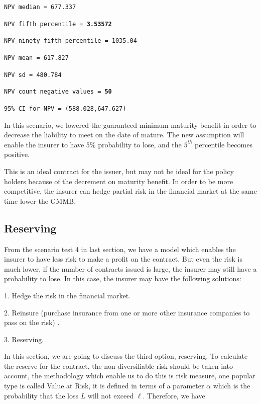 \documentclass{report}
\begin{document}
\texttt{NPV median = 677.337}

{\renewcommand\baselinestretch{1}\selectfont

\texttt{NPV fifth percentile = \textbf{3.53572}}

\texttt{NPV ninety fifth percentile = 1035.04}

\texttt{NPV mean = 617.827}

\texttt{NPV sd = 480.784}

\texttt{NPV count negative values = \textbf{50}}

\texttt{95\% CI for NPV = (588.028,647.627)}
\par}

In this scenario, we lowered the guaranteed minimum maturity benefit in order to decrease the liability to meet on the date of mature. The new assumption will enable the insurer to have 5\% probability to lose, and the $5^{th}$ percentile becomes positive. 

This is an ideal contract for the issuer, but may not be ideal for the policy holders because of the decrement on maturity benefit. In order to be more competitive, the insurer can hedge partial risk in the financial market at the same time lower the  GMMB.


\subsection{Reserving}


From the scenario test 4 in last section, we have a model which enables the insurer to have less risk to make a profit on the contract. But even the risk is much lower, if the number of contracts issued is large, the insurer may still have a probability to lose. In this case, the insurer may have the following solutions\cite{bib:reserve}:

1. Hedge the risk in the financial market.

2. Reinsure (purchase insurance from one or more other insurance companies to pass on the risk) \cite{bib:reserve-wiki}.

3. Reserving.

In this section, we are going to discuss the third option, reserving. To calculate the reserve for the contract, the non-diversifiable risk should be taken into account, the methodology which enable us to do this is risk measure\cite{bib:VaR}, one popular type is called Value at Risk, it is defined in terms of a parameter $\alpha$ which is the probability that the loss $L$ will not exceed $\ell$. Therefore, we have
\end{document}
